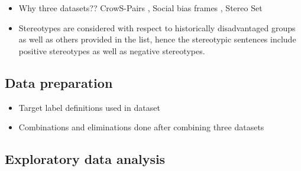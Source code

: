\begin{itemize}
    \item Why three datasets?? CrowS-Pairs \cite{nangia2020crows}, Social bias frames \cite{sap2019social}, Stereo Set \cite{nadeem2020stereoset}
    \item Stereotypes are considered with respect to historically disadvantaged groups as well as others provided in the list, hence the stereotypic sentences include positive stereotypes as well as negative stereotypes.
\end{itemize}
\subsection{Data preparation}
    \begin{itemize}
        \item Target label definitions used in dataset
        \item Combinations and eliminations done after combining three datasets
    \end{itemize}
\subsection{Exploratory data analysis}